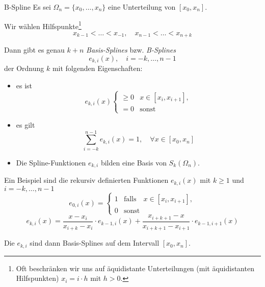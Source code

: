 \begin{bonus}{B-Spline}
    Es sei $\Omega_n = \{ x_0, \ldots, x_n \}$ eine Unterteilung von $[x_0, x_n]$.
    
    Wir wählen Hilfspunkte\footnote{Oft beschränken wir uns auf äquidistante Unterteilungen (mit äquidistanten Hilfspunkten) $x_i = i \cdot h$ mit $h > 0$.}
    \[ 
        x_{k-1} < \ldots < x_{-1}, \quad x_{n-1} < \ldots < x_{n + k}
    \]
    
    Dann gibt es genau $k + n$ \emph{Basis-Splines} bzw. \emph{B-Splines}
    \[
        e_{k, i}(x), \quad i = -k, \ldots, n-1    
    \]
    der Ordnung $k$ mit folgenden Eigenschaften: 
    \begin{itemize}
        \item es ist
              \[ 
                  e_{k, i}(x) 
                  \begin{cases}
                      \geq 0 & x \in [x_i, x_{i+1}], \\
                      = 0    & \text{sonst}
                  \end{cases}
              \]
        \item es gilt
              \[ 
                  \sum_{i = -k}^{n-1} e_{k, i}(x) = 1, \quad \forall x \in [x_0, x_n]
              \]
        \item Die Spline-Funktionen $e_{k, i}$ bilden eine Basis von $S_k(\Omega_n)$.
    \end{itemize}
    
    Ein Beispiel sind die rekursiv definierten Funktionen $e_{k, i}(x)$ mit $k \geq 1$ und $i = -k, \ldots, n-1$
    \[ 
        e_{0, i}(x) = 
        \begin{cases}
            1 & \text{falls} \quad x \in [x_i, x_{i+1}], \\
            0 & \text{sonst}
        \end{cases}
    \]
    \[ 
        e_{k, i}(x) = \frac{x - x_i}{x_{i+k} - x_i} \cdot e_{k-1, i}(x) + \frac{x_{i+k+1} - x}{x_{i+k+1} - x_{i+1}} \cdot e_{k-1, i+1}(x)
    \]
    
    Die $e_{k, i}$ sind dann Basis-Splines auf dem Intervall $[x_0, x_n]$.
\end{bonus}


